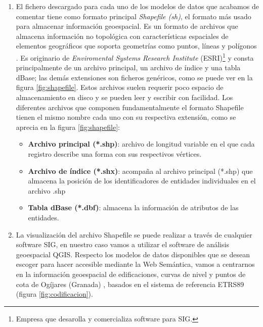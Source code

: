 \begin{enumerate}
	\item El fichero descargado para cada uno de los modelos de datos que acabamos de comentar tiene como formato principal \textit{Shapefile (sh)}, el formato más usado para almacenar información geoespacial. Es un formato de archivos que almacena información no topológica con características espaciales de elementos geográficos que soporta geometrías como puntos, líneas y polígonos \cite{tesis}.  Es originario de \textit{Enviromental Systems Research Institute} (ESRI)\footnote{Empresa que desarolla y comercializa software para SIG.} y consta principalmente de un archivo principal, un archivo de índice y una tabla dBase; las demás extensiones son ficheros genéricos, como se puede ver en la figura \ref{fig:shapefile}. Estos archivos suelen requerir poco espacio de almacenamiento en disco y se pueden leer y escribir con facilidad. Los diferentes archivos que componen fundamentalmente el formato Shapefile tienen el mismo nombre cada uno con su respectiva extensión, como se aprecia en la figura \ref{fig:shapefile}:
	


	\begin{itemize}
		\item \textbf{Archivo principal (*.shp)}: archivo de longitud variable en el que cada registro describe una forma con sus respectivos vértices. 
		
		\item \textbf{Archivo de índice (*.shx)}: acompaña al archivo principal (*.shp) que almacena la posición de los identificadores de entidades individuales en el archivo .shp 
		
		\item \textbf{Tabla dBase (*.dbf)}: almacena la información de atributos de las entidades. 
	\end{itemize}	

	

	
	
	\item La visualización del archivo Shapefile se puede realizar a través de cualquier software SIG, en nuestro caso vamos a utilizar el software de análisis geoespacial QGIS. Respecto los modelos de datos disponibles que se desean escoger para hacer accesible mediante la Web Semántica, vamos a centrarnos en la información geoespacial de edificaciones, curvas de nivel y puntos de cota de Ogíjares (Granada) \cite{info-sh}, basados en el sistema de referencia ETRS89 (figura \ref{fig:codificacion}).
	


\end{enumerate}
